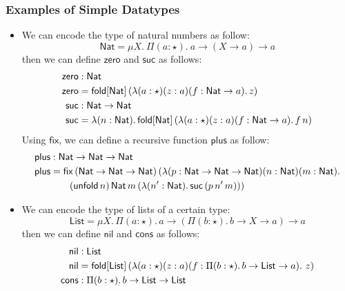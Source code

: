 \newcommand{\Nat}{\mathsf{Nat}} \newcommand{\zero}{\mathsf{zero}}
\newcommand{\suc}{\mathsf{suc}} \newcommand{\plus}{\mathsf{plus}}
\newcommand{\List}{\mathsf{List}} \newcommand{\nil}{\mathsf{nil}}
\newcommand{\cons}{\mathsf{cons}}
\newcommand{\length}{\mathsf{length}}
\newcommand{\PlFunc}{\Nat\rightarrow\Nat\rightarrow\Nat}
\newcommand{\case}{\mathsf{case}} \newcommand{\of}{\mathsf{of}}

\subsubsection{Examples of Simple Datatypes}

\begin{itemize}

\item We can encode the type of natural numbers as follow:
  \[
  \Nat = \mu X.\ \Pi(a : \star).\ a \rightarrow (X \rightarrow a)
  \rightarrow a
\]
then we can define $\zero$ and $\suc$ as follows:
\begin{align*}
  \zero &: \Nat \\
  \zero &= \fold{\Nat}{(\lambda (a : \star) (z : a) (f : \Nat \rightarrow a).\,z)}\\
  \suc &: \Nat \rightarrow \Nat\\
  \suc &= \lambda (n : \Nat).\,\fold{\Nat}{(\lambda (a : \star) (z : a) (f : \Nat \rightarrow a).\,f\,n)}
\end{align*}
Using $\mathsf{fix}$, we can define a recursive function $\plus$ as
follow:
\begin{align*}
  \plus &:\PlFunc\\
  \plus &=\mathsf{fix}\,(\PlFunc)\,(\lambda(p : \PlFunc)(n : \Nat)(m : \Nat).\\
        &\qquad (\unfold[\Nat]{n})\,\Nat\,m\,(\lambda (n^{\prime} : \Nat).\,\suc\,(p\,n^{\prime}\,m)))
\end{align*}
\item We can encode the type of lists of a certain type:
  \[
  \List = \mu X.\,\Pi(a : \star).\,a \rightarrow (\Pi (b : \star).\,b
  \rightarrow X \rightarrow a) \rightarrow a
\]
then we can define $\nil$ and $\cons$ as follows:
\begin{align*}
  \nil &: \List\\
  \nil &= \fold{\List}{(\lambda (a : \star) (z : a) (f : \Pi (b : \star).\,b \rightarrow \List \rightarrow a).\ z)}\\
  \cons &: \Pi (b : \star).\,b \rightarrow \List \rightarrow \List\\

\end{align*}
\end{itemize}
